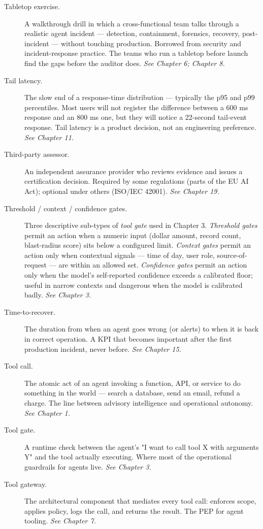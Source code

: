 \begin{description}
  \item[Tabletop exercise.] A walkthrough drill in which a cross-functional team talks through a realistic agent incident — detection, containment, forensics, recovery, post-incident — without touching production. Borrowed from security and incident-response practice. The teams who run a tabletop before launch find the gaps before the auditor does. \textit{See Chapter 6; Chapter 8.}
  \item[Tail latency.] The slow end of a response-time distribution — typically the p95 and p99 percentiles. Most users will not register the difference between a 600 ms response and an 800 ms one, but they will notice a 22-second tail-event response. Tail latency is a product decision, not an engineering preference. \textit{See Chapter 11.}
  \item[Third-party assessor.] An independent assurance provider who reviews evidence and issues a certification decision. Required by some regulations (parts of the EU AI Act); optional under others (ISO/IEC 42001). \textit{See Chapter 19.}
  \item[Threshold / context / confidence gates.] Three descriptive sub-types of \textit{tool gate} used in Chapter 3. \textit{Threshold gates} permit an action when a numeric input (dollar amount, record count, blast-radius score) sits below a configured limit. \textit{Context gates} permit an action only when contextual signals — time of day, user role, source-of-request — are within an allowed set. \textit{Confidence gates} permit an action only when the model's self-reported confidence exceeds a calibrated floor; useful in narrow contexts and dangerous when the model is calibrated badly. \textit{See Chapter 3.}
  \item[Time-to-recover.] The duration from when an agent goes wrong (or alerts) to when it is back in correct operation. A KPI that becomes important after the first production incident, never before. \textit{See Chapter 15.}
  \item[Tool call.] The atomic act of an agent invoking a function, API, or service to do something in the world — search a database, send an email, refund a charge. The line between advisory intelligence and operational autonomy. \textit{See Chapter 1.}
  \item[Tool gate.] A runtime check between the agent's "I want to call tool X with arguments Y" and the tool actually executing. Where most of the operational guardrails for agents live. \textit{See Chapter 3.}
  \item[Tool gateway.] The architectural component that mediates every tool call: enforces scope, applies policy, logs the call, and returns the result. The PEP for agent tooling. \textit{See Chapter 7.}

\end{description}

